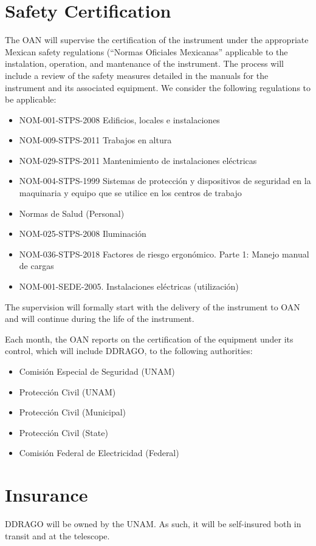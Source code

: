 \documentclass{article}
\begin{document}
\clearpage
\section{Safety Certification}

The OAN will supervise the certification of the instrument under the appropriate Mexican safety regulations (“Normas Oficiales Mexicanas” applicable to the instalation, operation, and mantenance of the instrument. The process will include a review of the safety measures detailed in the manuals for the instrument and its associated equipment. We consider the following regulations to be applicable:

\begin{itemize}
    \item NOM-001-STPS-2008 Edificios, locales e instalaciones
    \item NOM-009-STPS-2011 Trabajos en altura
    \item NOM-029-STPS-2011 Mantenimiento de instalaciones eléctricas
    \item NOM-004-STPS-1999 Sistemas de protección y dispositivos de seguridad en la maquinaria y equipo que se utilice en los centros de trabajo
    \item Normas de Salud (Personal)
    \item NOM-025-STPS-2008 Iluminación
    \item NOM-036-STPS-2018 Factores de riesgo ergonómico. Parte 1: Manejo manual de cargas
    \item NOM-001-SEDE-2005. Instalaciones eléctricas (utilización)
\end{itemize}

The supervision will formally start with the delivery of the instrument to OAN and will continue during the life of the instrument.

Each month, the OAN reports on the certification of the equipment under its control, which will include DDRAGO, to the following authorities:

\begin{itemize}
    \item Comisión Especial de Seguridad (UNAM)
    \item Protección Civil (UNAM)
    \item Protección Civil (Municipal)
    \item Protección Civil (State)
    \item Comisión Federal de Electricidad (Federal)
\end{itemize}

\clearpage
\section{Insurance}

DDRAGO will be owned by the UNAM. As such, it will be self-insured both in transit and at the telescope.
\end{document}
